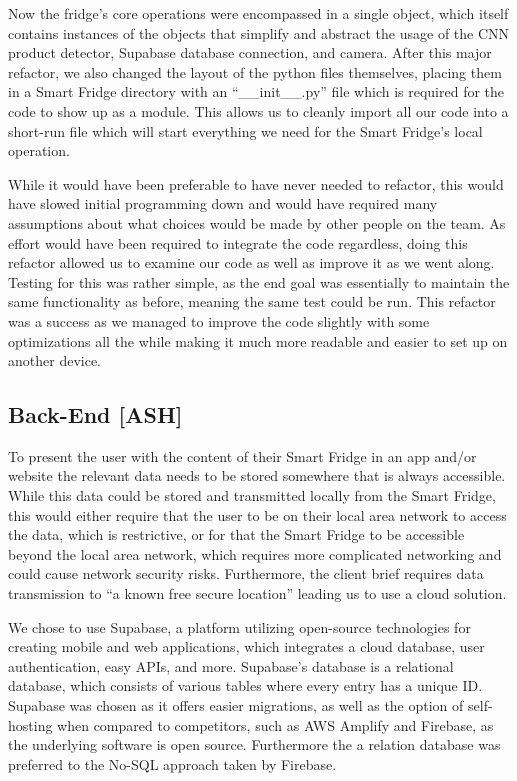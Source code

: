 Now the fridge's core operations were encompassed in a single object, which itself contains instances of the objects that simplify and abstract the usage of the CNN product detector, Supabase database connection, and camera.
After this major refactor, we also changed the layout of the python files themselves, placing them in a Smart Fridge directory with an “\_\_init\_\_.py” file which is required for the code to show up as a module.
This allows us to cleanly import all our code into a short-run file which will start everything we need for the Smart Fridge's local operation.

While it would have been preferable to have never needed to refactor, this would have slowed initial programming down and would have required many assumptions about what choices would be made by other people on the team.
As effort would have been required to integrate the code regardless, doing this refactor allowed us to examine our code as well as improve it as we went along.
Testing for this was rather simple, as the end goal was essentially to maintain the same functionality as before, meaning the same test could be run.
This refactor was a success as we managed to improve the code slightly with some optimizations all the while making it much more readable and easier to set up on another device.




\subsection{Back-End [ASH]}

To present the user with the content of their Smart Fridge in an app and/or website the relevant data needs to be stored somewhere that is always accessible.
While this data could be stored and transmitted locally from the Smart Fridge, this would either require that the user to be on their local area network to access the data, which is restrictive, or for that the Smart Fridge to be accessible beyond the local area network, which requires more complicated networking and could cause network security risks.
Furthermore, the client brief requires data transmission to “a known free secure location” leading us to use a cloud solution.

We chose to use Supabase, a platform utilizing open-source technologies for creating mobile and web applications, which integrates a cloud database, user authentication, easy APIs, and more.
Supabase's database is a relational database, which consists of various tables where every entry has a unique ID.
Supabase was chosen as it offers easier migrations, as well as the option of self-hosting when compared to competitors, such as AWS Amplify and Firebase, as the underlying software is open source.
Furthermore the a relation database was preferred to the No-SQL approach taken by Firebase.

